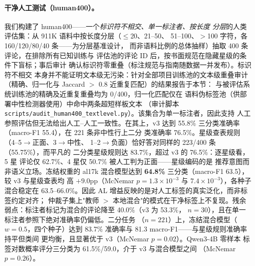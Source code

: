 \documentclass[11pt,a4paper]{article}
\newcommand{\code}[1]{\texttt{#1}}
\begin{document}
\paragraph{干净人工测试（human400）。}
\label{sec:human400}
我们构建了 human400——一个\emph{标识符不相交、单一标注者、按长度
分层}的人类评估集：从 911K 语料中按长度分层（$\le$20、21--50、
51--100、$>$100 字符，各 160/120/80/40 条——为分层基准设计，
而非语料比例的总体抽样）抽取 400 条评论，在排除所有已知训练与
评估池的评论 ID 后，按书面规范在隐藏星级的条件下盲标；事后审计
确认标识符零重叠（标注规范与指南随数据一并发布）。标识符不相交
本身并不能证明文本级无污染：针对全部项目训练池的文本级重叠审计
（精确、归一化与 Jaccard $>$ 0.8 近重复匹配）的结果报告于本节：
与被评估系统训练池的精确及近重复重叠均为 0/400，归一化匹配仅在
语料伪标签池（供部署中性检测器使用）中命中两条超短样板文本
（审计脚本 \code{scripts/audit\_human400\_textlevel.py}）。该集合为单一标注者，因此支持
人工参照评估但无法给出人工--人工一致性。在其上，v3 达到
55.8\% 三分类准确率（macro-F1 55.4），在 221 条非中性行上二分
类准确率 76.5\%。星级查表规则（4--5$\to$正面、3$\to$中性、
1--2$\to$负面）恰好答对同样的 223/400 条（55.75\%），而平凡的
二分类星级规则达 83.7\%，超过 v3 的 76.5\%：逐星级看，5 星
评论仅 62.7\%、4 星仅 50.7\% 被人工判为正面——星级编码的是
推荐意图而非语义立场。冻结权重的 al17k 混合模型达到
\textbf{64.8\%} 三分类（macro-F1 63.5），较 v3 与星级查表均
高 $+9.0$pp（McNemar $p{=}1.3{\times}10^{-3}$ 与
$7.4{\times}10^{-3}$），各种子混合稳定在 63.5--66.0\%。因此
AL 增益反映的是对人工标签的真实泛化，而非标签约定对齐；
仲裁子集上"教师 $>$ 本地混合"的模式在干净标签上不复现。残余
弱点：标注者标记为混合的评论降至 40.0\%（v3 为 53.3\%，
$n{=}30$），且在单一标注者参照下绝对准确率仍偏低。二分任务
（$n{=}221$）上，冻结混合模型（$w{=}0.5$，四个种子）达到
83.7\% 准确率与 81.3 macro-F1——与星级规则准确率持平但类间
更均衡，且显著优于 v3（McNemar $p{=}0.02$）。Qwen3-4B 零样本
标签对数概率评分三分类为 61.5\%/59.0，介于 v3 与混合模型之间
（McNemar $p{=}0.26$）。
\end{document}
